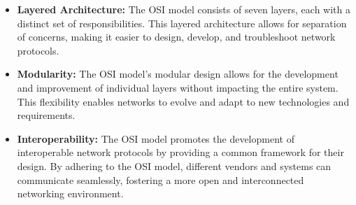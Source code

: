 \vspace{-0.25em}
\begin{itemize}
    \item \textbf{Layered Architecture:} The OSI model consists of seven layers, each with a distinct set of responsibilities. This layered architecture allows for separation of concerns, making it easier to design, develop, and troubleshoot network protocols.
    
    \item \textbf{Modularity:} The OSI model's modular design allows for the development and improvement of individual layers without impacting the entire system. This flexibility enables networks to evolve and adapt to new technologies and requirements.
    
    \item \textbf{Interoperability:} The OSI model promotes the development of interoperable network protocols by providing a common framework for their design. By adhering to the OSI model, different vendors and systems can communicate seamlessly, fostering a more open and interconnected networking environment.
\end{itemize}

